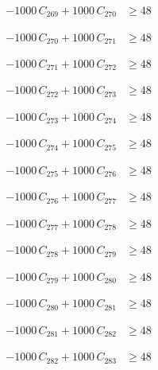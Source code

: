 \documentclass[a4paper,11pt]{article}
\begin{document}
\begin{align}
-1000\,C_{269} + 1000\,C_{270} &\geq 48 \nonumber
\end{align}

\begin{align}
-1000\,C_{270} + 1000\,C_{271} &\geq 48 \nonumber
\end{align}

\begin{align}
-1000\,C_{271} + 1000\,C_{272} &\geq 48 \nonumber
\end{align}

\begin{align}
-1000\,C_{272} + 1000\,C_{273} &\geq 48 \nonumber
\end{align}

\begin{align}
-1000\,C_{273} + 1000\,C_{274} &\geq 48 \nonumber
\end{align}

\begin{align}
-1000\,C_{274} + 1000\,C_{275} &\geq 48 \nonumber
\end{align}

\begin{align}
-1000\,C_{275} + 1000\,C_{276} &\geq 48 \nonumber
\end{align}

\begin{align}
-1000\,C_{276} + 1000\,C_{277} &\geq 48 \nonumber
\end{align}

\begin{align}
-1000\,C_{277} + 1000\,C_{278} &\geq 48 \nonumber
\end{align}

\begin{align}
-1000\,C_{278} + 1000\,C_{279} &\geq 48 \nonumber
\end{align}

\begin{align}
-1000\,C_{279} + 1000\,C_{280} &\geq 48 \nonumber
\end{align}

\begin{align}
-1000\,C_{280} + 1000\,C_{281} &\geq 48 \nonumber
\end{align}

\begin{align}
-1000\,C_{281} + 1000\,C_{282} &\geq 48 \nonumber
\end{align}

\begin{align}
-1000\,C_{282} + 1000\,C_{283} &\geq 48 \nonumber
\end{align}
\end{document}
